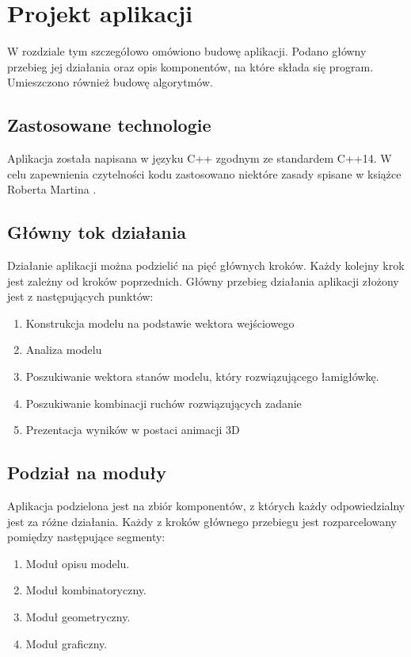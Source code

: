 \chapter{Projekt aplikacji}
\thispagestyle{chapterBeginStyle}
W rozdziale tym szczegółowo omówiono budowę aplikacji. Podano główny przebieg jej działania oraz opis komponentów, na które składa się program. Umieszczono również budowę algorytmów.

\section{Zastosowane technologie}
Aplikacja została napisana w języku C++ zgodnym ze standardem C++14\cite{Standard}. W celu zapewnienia czytelności kodu zastosowano niektóre zasady spisane w książce Roberta Martina \cite{CleanCode}.

\section{Główny tok działania}
Działanie aplikacji można podzielić na pięć głównych kroków. Każdy kolejny krok jest zależny od kroków poprzednich. Główny przebieg działania aplikacji złożony jest z następujących punktów:
\begin{enumerate}
\item Konstrukcja modelu na podstawie wektora wejściowego
\item Analiza modelu
\item Poszukiwanie wektora stanów modelu, który rozwiązującego łamigłówkę.
\item Poszukiwanie kombinacji ruchów rozwiązujących zadanie
\item Prezentacja wyników w postaci animacji 3D
\end{enumerate}

\section{Podział na moduły}
Aplikacja podzielona jest na zbiór komponentów, z których każdy odpowiedzialny jest za różne działania. Każdy z kroków głównego przebiegu jest rozparcelowany pomiędzy następujące segmenty:
\begin{enumerate}
\item Moduł opisu modelu.
\item Moduł kombinatoryczny.
\item Moduł geometryczny.
\item Moduł graficzny.
\end{enumerate}

